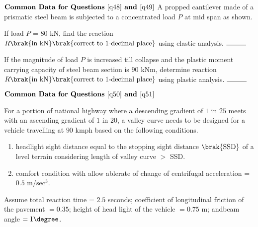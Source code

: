 	$\textbf{Common Data for Questions } \ref{q48} \textbf{ and } \ref{q49}$
	\newline
    A propped cantilever made of a prismatic steel beam is subjected to a concentrated load $P$ at mid span as shown.
	\begin{center}
	\end{center}

	\item \label{q48} If load $P$ = $80$ kN, find the reaction $R \brak{\text{in kN}} \brak{\text{correct to } 1 \text{-decimal place}}$ using elastic analysis. $\rule{1cm}{0.15mm}$ 
	\hfill{}

	\item \label{q49} If the magnitude of load $P$ is increased till collapse and the plastic moment carrying capacity of steel beam section is $90$ kNm, determine reaction $R \brak{\text{in kN}} \brak{\text{correct to } 1 \text{-decimal place}}$ using plastic analysis. $\rule{1cm}{0.15mm}$ 
	\hfill{}

	$\textbf{Common Data for Questions } \ref{q50} \textbf{ and } \ref{q51}$
	\newline

	For a portion of national highway where a descending gradient of $1$ in $25$ meets with an ascending gradient of $1$ in $20$, a valley curve needs to be designed for a vehicle travelling at $90$ kmph based on the following conditions.
	\begin{enumerate}
		\item headlight sight distance equal to the stopping sight distance $\brak{\text{SSD}}$ of a level terrain considering length of valley curve $>$ SSD.
		\item comfort condition with allow ablerate of change of centrifugal acceleration = $0.5$ m/$\text{sec}^3$.
	\end{enumerate}
	Assume total reaction time = $2.5$ seconds; coefficient of longitudinal friction of the pavement $= 0.35$; height of head light of the vehicle $= 0.75$ m; andbeam angle $= 1\degree$. 

